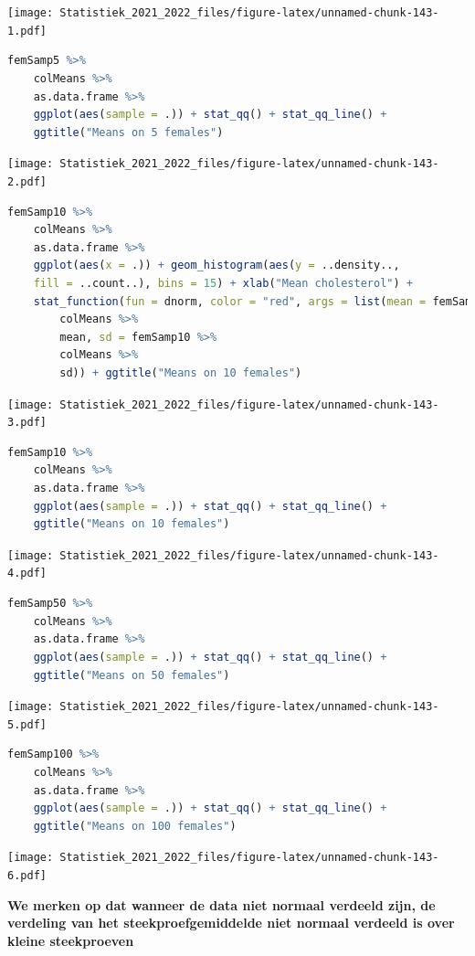 \documentclass[
  12pt,dutch,coursenotes]{book}
\theoremstyle{definition}
\theoremstyle{definition}
\theoremstyle{definition}
\theoremstyle{definition}
\theoremstyle{remark}
\begin{document}
\texttt{[image: Statistiek\_2021\_2022\_files/figure-latex/unnamed-chunk-143-1.pdf]}

\begin{lstlisting}[language=R]
femSamp5 %>%
    colMeans %>%
    as.data.frame %>%
    ggplot(aes(sample = .)) + stat_qq() + stat_qq_line() +
    ggtitle("Means on 5 females")
\end{lstlisting}

\texttt{[image: Statistiek\_2021\_2022\_files/figure-latex/unnamed-chunk-143-2.pdf]}

\begin{lstlisting}[language=R]
femSamp10 %>%
    colMeans %>%
    as.data.frame %>%
    ggplot(aes(x = .)) + geom_histogram(aes(y = ..density..,
    fill = ..count..), bins = 15) + xlab("Mean cholesterol") +
    stat_function(fun = dnorm, color = "red", args = list(mean = femSamp10 %>%
        colMeans %>%
        mean, sd = femSamp10 %>%
        colMeans %>%
        sd)) + ggtitle("Means on 10 females")
\end{lstlisting}

\texttt{[image: Statistiek\_2021\_2022\_files/figure-latex/unnamed-chunk-143-3.pdf]}

\begin{lstlisting}[language=R]
femSamp10 %>%
    colMeans %>%
    as.data.frame %>%
    ggplot(aes(sample = .)) + stat_qq() + stat_qq_line() +
    ggtitle("Means on 10 females")
\end{lstlisting}

\texttt{[image: Statistiek\_2021\_2022\_files/figure-latex/unnamed-chunk-143-4.pdf]}

\begin{lstlisting}[language=R]
femSamp50 %>%
    colMeans %>%
    as.data.frame %>%
    ggplot(aes(sample = .)) + stat_qq() + stat_qq_line() +
    ggtitle("Means on 50 females")
\end{lstlisting}

\texttt{[image: Statistiek\_2021\_2022\_files/figure-latex/unnamed-chunk-143-5.pdf]}

\begin{lstlisting}[language=R]
femSamp100 %>%
    colMeans %>%
    as.data.frame %>%
    ggplot(aes(sample = .)) + stat_qq() + stat_qq_line() +
    ggtitle("Means on 100 females")
\end{lstlisting}

\texttt{[image: Statistiek\_2021\_2022\_files/figure-latex/unnamed-chunk-143-6.pdf]}

\textbf{We merken op dat wanneer de data niet normaal verdeeld zijn, de verdeling van het steekproefgemiddelde niet normaal verdeeld is over kleine steekproeven}
\end{document}
